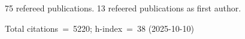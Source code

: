 75 refereed publications. 13 refeered publications as first author.

Total citations~=~5220; h-index~=~38 (2025-10-10)